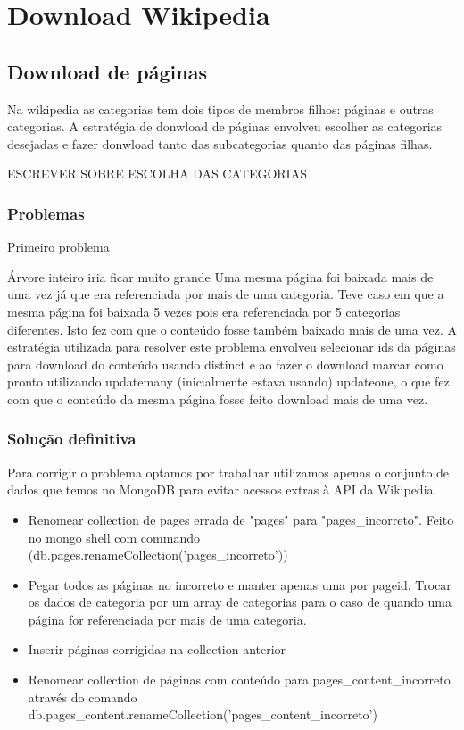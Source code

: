\section{Download Wikipedia}

\subsection{Download de páginas}

Na wikipedia as categorias tem dois tipos de membros filhos: páginas e outras categorias.
A estratégia de donwload de páginas envolveu escolher as categorias desejadas e fazer donwload tanto das subcategorias quanto das páginas filhas.

ESCREVER SOBRE ESCOLHA DAS CATEGORIAS

\subsubsection{Problemas}

Primeiro problema

Árvore inteiro iria ficar muito grande
Uma mesma página foi baixada mais de uma vez já que era referenciada por mais de uma categoria. Teve caso em que a mesma página foi baixada 5 vezes pois era 
referenciada por 5 categorias diferentes. Isto fez com que o conteúdo fosse também baixado mais de uma vez. A estratégia utilizada para resolver este problema 
envolveu selecionar ids da páginas para download do conteúdo usando distinct e ao fazer o download marcar como pronto utilizando updatemany (inicialmente estava 
usando) updateone, o que fez com que o conteúdo da mesma página fosse feito download mais de uma vez.

\subsubsection{Solução definitiva}

Para corrigir o problema optamos por trabalhar utilizamos apenas o conjunto de dados que temos no MongoDB para evitar acessos extras à API da Wikipedia.

\begin{itemize}
    \item Renomear collection de pages errada de "pages" para "pages\_incorreto". Feito no mongo shell com commando (db.pages.renameCollection('pages\_incorreto'))
    \item Pegar todos as páginas no incorreto e manter apenas uma por pageid. Trocar os dados de categoria por um array de categorias para o caso de quando uma 
    página for referenciada por mais de uma categoria. 
    \item Inserir páginas corrigidas na collection anterior
    \item Renomear collection de páginas com conteúdo para pages\_content\_incorreto através do comando 
    db.pages\_content.renameCollection('pages\_content\_incorreto')

\end{itemize}

